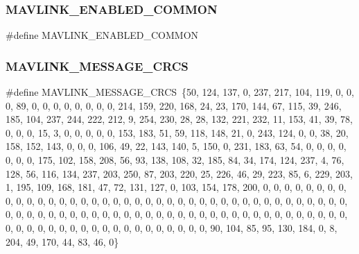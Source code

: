 \mbox{\label{common_8h_abbb5e98ad325c5bd8eae9e08f7e48fbe}} 
\subsubsection{M\+A\+V\+L\+I\+N\+K\+\_\+\+E\+N\+A\+B\+L\+E\+D\+\_\+\+C\+O\+M\+M\+ON}
{\footnotesize\ttfamily \#define M\+A\+V\+L\+I\+N\+K\+\_\+\+E\+N\+A\+B\+L\+E\+D\+\_\+\+C\+O\+M\+M\+ON}

\mbox{\label{common_8h_a3f709d5835acb54a11202a5fdc7a6bfe}} 
\subsubsection{M\+A\+V\+L\+I\+N\+K\+\_\+\+M\+E\+S\+S\+A\+G\+E\+\_\+\+C\+R\+CS}
{\footnotesize\ttfamily \#define M\+A\+V\+L\+I\+N\+K\+\_\+\+M\+E\+S\+S\+A\+G\+E\+\_\+\+C\+R\+CS~\{50, 124, 137, 0, 237, 217, 104, 119, 0, 0, 0, 89, 0, 0, 0, 0, 0, 0, 0, 0, 214, 159, 220, 168, 24, 23, 170, 144, 67, 115, 39, 246, 185, 104, 237, 244, 222, 212, 9, 254, 230, 28, 28, 132, 221, 232, 11, 153, 41, 39, 78, 0, 0, 0, 15, 3, 0, 0, 0, 0, 0, 153, 183, 51, 59, 118, 148, 21, 0, 243, 124, 0, 0, 38, 20, 158, 152, 143, 0, 0, 0, 106, 49, 22, 143, 140, 5, 150, 0, 231, 183, 63, 54, 0, 0, 0, 0, 0, 0, 0, 175, 102, 158, 208, 56, 93, 138, 108, 32, 185, 84, 34, 174, 124, 237, 4, 76, 128, 56, 116, 134, 237, 203, 250, 87, 203, 220, 25, 226, 46, 29, 223, 85, 6, 229, 203, 1, 195, 109, 168, 181, 47, 72, 131, 127, 0, 103, 154, 178, 200, 0, 0, 0, 0, 0, 0, 0, 0, 0, 0, 0, 0, 0, 0, 0, 0, 0, 0, 0, 0, 0, 0, 0, 0, 0, 0, 0, 0, 0, 0, 0, 0, 0, 0, 0, 0, 0, 0, 0, 0, 0, 0, 0, 0, 0, 0, 0, 0, 0, 0, 0, 0, 0, 0, 0, 0, 0, 0, 0, 0, 0, 0, 0, 0, 0, 0, 0, 0, 0, 0, 0, 0, 0, 0, 0, 0, 0, 0, 0, 0, 0, 0, 0, 0, 0, 0, 0, 0, 0, 0, 0, 90, 104, 85, 95, 130, 184, 0, 8, 204, 49, 170, 44, 83, 46, 0\}}

\mbox{\label{common_8h_a384e37b2c133fdf33407436a982d2fb7}} 
